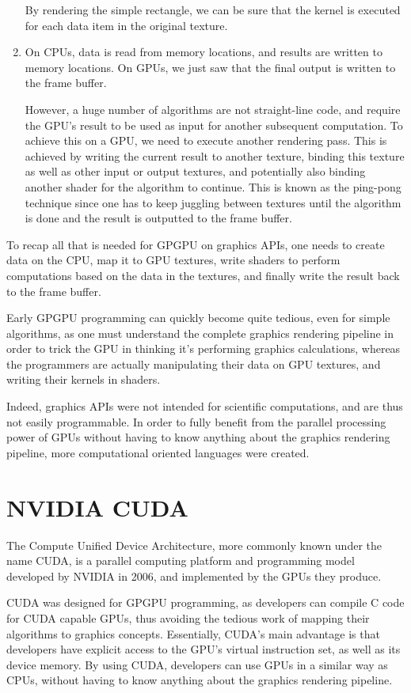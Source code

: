 \documentclass[10pt, a4paper]{report}
\begin{document}
\begin{enumerate}
By rendering the simple rectangle, we can be sure that the kernel is executed
for each data item in the original texture.

\item On CPUs, data is read from memory locations, and results are written to
memory locations.
On GPUs, we just saw that the final output is written to the frame buffer.

However, a huge number of algorithms are not straight-line code, and require the
GPU's result to be used as input for another subsequent computation.
To achieve this on a GPU, we need to execute another rendering pass.
This is achieved by writing the current result to another texture, binding this
texture as well as other input or output textures, and potentially also binding
another shader for the algorithm to continue.
This is known as the ping-pong technique since one has to keep juggling between
textures until the algorithm is done and the result is outputted to the frame
buffer.

\end{enumerate}

To recap all that is needed for GPGPU on graphics APIs, one needs to create data
on the CPU, map it to GPU textures, write shaders to perform computations based
on the data in the textures, and finally write the result back to the frame
buffer.

Early GPGPU programming can quickly become quite tedious, even for simple
algorithms, as one must understand the complete graphics rendering pipeline in
order to trick the GPU in thinking it's performing graphics calculations,
whereas the programmers are actually manipulating their data on GPU textures,
and writing their kernels in shaders.

Indeed, graphics APIs were not intended for scientific computations, and are
thus not easily programmable.
In order to fully benefit from the parallel processing power of GPUs without
having to know anything about the graphics rendering pipeline, more
computational oriented languages were created.

\chapter{NVIDIA CUDA}
The Compute Unified Device Architecture, more commonly known under the name
CUDA, is a parallel computing platform and programming model developed by
NVIDIA in 2006, and implemented by the GPUs they produce.

CUDA was designed for GPGPU programming, as developers can compile C code for
CUDA capable GPUs, thus avoiding the tedious work of mapping their algorithms to
graphics concepts.
Essentially, CUDA's main advantage is that developers have explicit access to
the GPU's virtual instruction set, as well as its device memory.
By using CUDA, developers can use GPUs in a similar way as CPUs, without having
to know anything about the graphics rendering pipeline.
\end{document}

